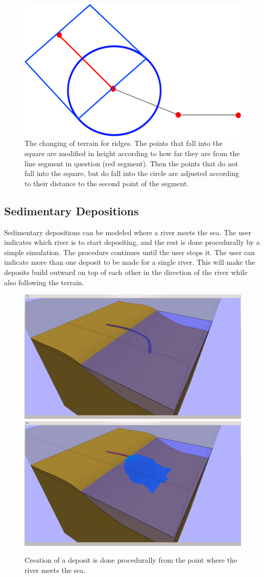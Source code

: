 \documentclass[a4paper,12pt]{report}
\begin{document}
\begin{figure}
\centering
\includegraphics[width=.7\linewidth]{thesis/ridgeTerrain.pdf}
 \caption{The changing of terrain for ridges. The points that fall into the square are modified in height according to how far they are from the line segment in question (red segment). Then the points that do not fall into the square, but do fall into the circle are adjusted according to their distance to the second point of the segment.}
 \label{fig:ridgeTerrain}
\end{figure}


\subsection{Sedimentary Depositions}

Sedimentary depositions can be modeled where a river meets the sea. The user indicates which river is to start depositing, and the rest is done procedurally by a simple simulation. The procedure continues until the user stops it. The user can indicate more than one deposit to be made for a single river. This will make the deposits build outward on top of each other in the direction of the river while also following the terrain.

\begin{figure}
\includegraphics[trim = 90mm 7mm 80mm 30mm, clip,width=.5\linewidth]{thesis/results/depositBefore.png}
\includegraphics[trim = 90mm 7mm 80mm 30mm, clip,width=.5\linewidth]{thesis/results/depositCreated.png}
 \caption{Creation of a deposit is done procedurally from the point where the river meets the sea.}
 \label{fig:depositCreate}
\end{figure}
\end{document}
